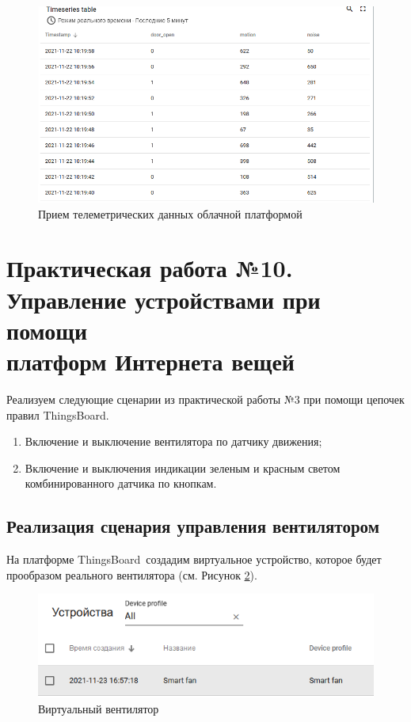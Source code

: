 \documentclass[utf8x]{G7-32} %
\newcommand{\tb}{ThingsBoard~}
\begin{document}
\begin{figure}[h!]
	\centering
	\includegraphics[width=0.6\linewidth]{images/dop9-recieve}
	\caption{Прием телеметрических данных облачной платформой}
	\label{fig:dop9-recieve}
\end{figure}
\hfill\newpage\hfill\newpage

\section{Практическая работа №10. \\Управление устройствами при помощи \\платформ Интернета вещей}

Реализуем следующие сценарии из практической работы №3 при помощи цепочек правил ThingsBoard.

\begin{enumerate}
	\item Включение и выключение вентилятора по датчику движения;
	\item Включение и выключения индикации зеленым и красным светом комбинированного датчика по кнопкам.
\end{enumerate}

\subsection{Реализация сценария управления вентилятором}
На платформе \tb создадим виртуальное устройство, которое будет прообразом реального вентилятора (см. Рисунок \ref{fig:dev}).

\begin{figure}[h!]
	\centering
	\includegraphics[width=0.5\linewidth]{images/dev}
	\caption{Виртуальный вентилятор}
	\label{fig:dev}
\end{figure}
\end{document}
